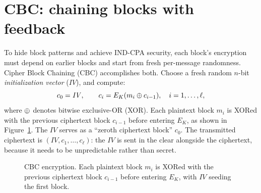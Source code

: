 \section{CBC: chaining blocks with feedback}

To hide block patterns and achieve IND-CPA security, each block's encryption must depend on earlier blocks and start from fresh per-message randomness. Cipher Block Chaining (CBC) accomplishes both. Choose a fresh random $n$-bit \emph{initialization vector} ($\mathit{IV}$), and compute:
\[
c_0 = \mathit{IV}, \qquad c_i = E_K(m_i \oplus c_{i-1}), \quad i = 1, \dots, \ell,
\]
where $\oplus$ denotes bitwise exclusive-OR (XOR). Each plaintext block $m_i$ is XORed with the previous ciphertext block $c_{i-1}$ before entering $E_K$, as shown in Figure~\ref{ch13:cbc-diagram}. The $\mathit{IV}$ serves as a ``zeroth ciphertext block'' $c_0$. The transmitted ciphertext is $(\mathit{IV}, c_1, \dots, c_\ell)$: the $\mathit{IV}$ is sent in the clear alongside the ciphertext, because it needs to be unpredictable rather than secret.

\begin{figure}[htbp]
\centering
{}
\caption{CBC encryption. Each plaintext block $m_i$ is XORed with the previous ciphertext block $c_{i-1}$ before entering $E_K$, with $\mathit{IV}$ seeding the first block.}
\label{ch13:cbc-diagram}
\end{figure}

